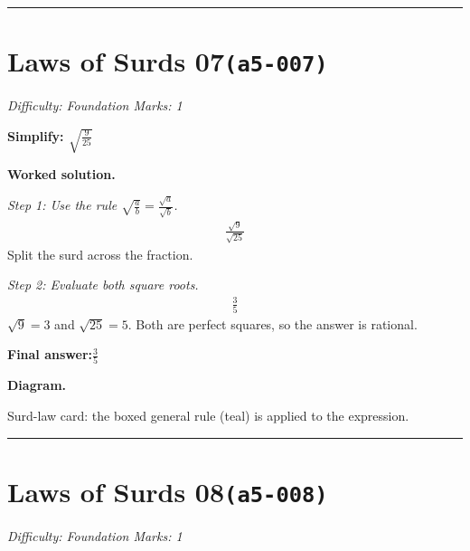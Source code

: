 \documentclass[11pt]{article}
\newcommand{\question}[1]{\par\medskip\noindent\textbf{#1}\par}
\begin{document}
\medskip\hrule

\section*{Laws of Surds 07\quad\small\texttt{(a5-007)}}
\textit{Difficulty: Foundation \quad\textbar\quad Marks: 1}

\question{Simplify: \( \sqrt{\frac{9}{25}} \)}

\textbf{Worked solution.}

\textit{Step 1: Use the rule \( \sqrt{\frac{a}{b}} = \frac{\sqrt{a}}{\sqrt{b}} \).}
\[\begin{gathered}
\frac{\sqrt{9}}{\sqrt{25}}
\end{gathered}\]
Split the surd across the fraction.

\textit{Step 2: Evaluate both square roots.}
\[\begin{gathered}
\frac{3}{5}
\end{gathered}\]
\( \sqrt{9} = 3 \) and \( \sqrt{25} = 5 \). Both are perfect squares, so the answer is rational.

\begin{answerbox}
\textbf{Final answer:}\quad \(\displaystyle \frac{3}{5}\)
\end{answerbox}
\textbf{Diagram.}

\begin{center}
\end{center}
\small Surd-law card: the boxed general rule (teal) is applied to the expression.\normalsize

\medskip\hrule

\section*{Laws of Surds 08\quad\small\texttt{(a5-008)}}
\textit{Difficulty: Foundation \quad\textbar\quad Marks: 1}
\end{document}
